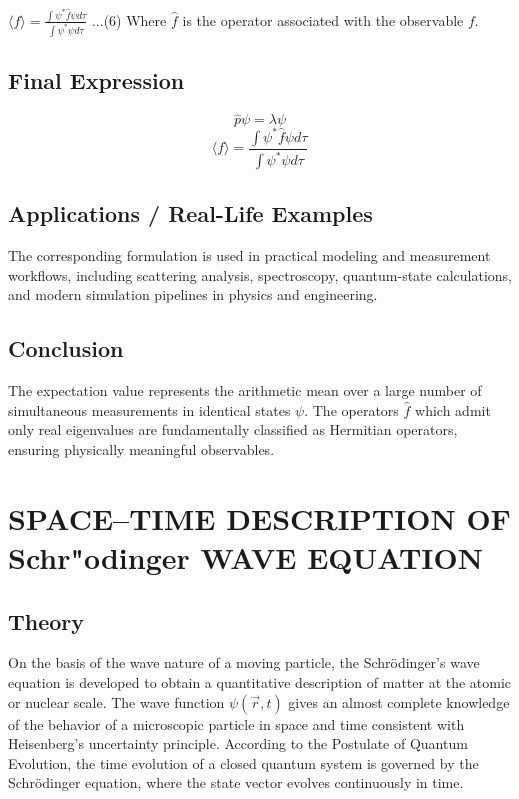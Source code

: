 \documentclass[12pt]{report}
\begin{document}
$\langle f \rangle = \frac{\int \psi^* \hat{f} \psi d\tau}{\int \psi^* \psi d\tau}$ ...(6) Where $\hat{f}$ is the operator associated with the observable $f$.

\subsection*{Final Expression}

\begin{equation*}\hat{p}\psi = \lambda\psi\end{equation*}
\begin{equation*}\langle f \rangle = \frac{\int \psi^* \hat{f} \psi d\tau}{\int \psi^* \psi d\tau}\end{equation*}

\subsection*{Applications / Real-Life Examples}
The corresponding formulation is used in practical modeling and measurement workflows, including scattering analysis, spectroscopy, quantum-state calculations, and modern simulation pipelines in physics and engineering.

\subsection*{Conclusion}

The expectation value represents the arithmetic mean over a large number of simultaneous measurements in identical states $\psi$. The operators $\hat{f}$ which admit only real eigenvalues are fundamentally classified as Hermitian operators, ensuring physically meaningful observables.

\section{SPACE–TIME DESCRIPTION OF Schr"odinger WAVE EQUATION}



\subsection*{Theory}

On the basis of the wave nature of a moving particle, the Schrödinger's wave equation is developed to obtain a quantitative description of matter at the atomic or nuclear scale. The wave function $\psi(\vec{r}, t)$ gives an almost complete knowledge of the behavior of a microscopic particle in space and time consistent with Heisenberg's uncertainty principle. According to the Postulate of Quantum Evolution, the time evolution of a closed quantum system is governed by the Schrödinger equation, where the state vector evolves continuously in time.
\end{document}

